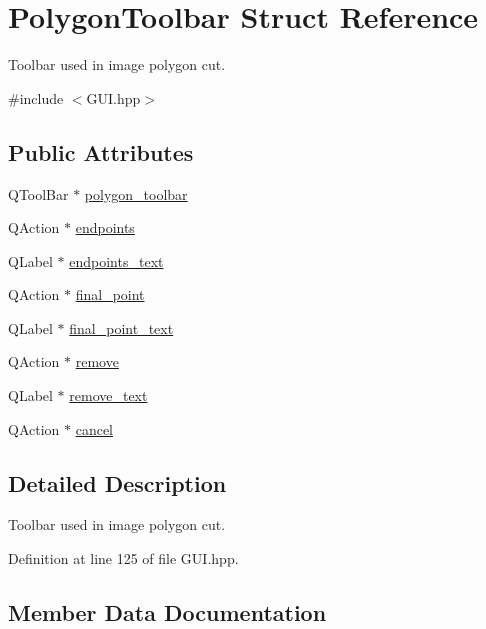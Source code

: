\hypertarget{structPolygonToolbar}{}\section{Polygon\+Toolbar Struct Reference}
\label{structPolygonToolbar}


Toolbar used in image polygon cut.  




{\ttfamily \#include $<$G\+U\+I.\+hpp$>$}

\subsection*{Public Attributes}
\begin{DoxyCompactItemize}
\item 
Q\+Tool\+Bar $\ast$ \mbox{\hyperlink{structPolygonToolbar_a5388c77217c5bea7075cf234c508b8d6}{polygon\+\_\+toolbar}}
\item 
Q\+Action $\ast$ \mbox{\hyperlink{structPolygonToolbar_a78a569efc30754e02b7d8f5d74ede0ec}{endpoints}}
\item 
Q\+Label $\ast$ \mbox{\hyperlink{structPolygonToolbar_a4ab3ad9905d894a2f166a4e1cbfb9e3a}{endpoints\+\_\+text}}
\item 
Q\+Action $\ast$ \mbox{\hyperlink{structPolygonToolbar_a25d471a6081bfa4107d5f1cd9a61d243}{final\+\_\+point}}
\item 
Q\+Label $\ast$ \mbox{\hyperlink{structPolygonToolbar_a3af92f094b85ad63be4d9dcf37a88fa8}{final\+\_\+point\+\_\+text}}
\item 
Q\+Action $\ast$ \mbox{\hyperlink{structPolygonToolbar_ad5f83fc2ac8daf17ae3014d05d3f5d5b}{remove}}
\item 
Q\+Label $\ast$ \mbox{\hyperlink{structPolygonToolbar_ad396d8e37e491bb7bfa8bf91d318014c}{remove\+\_\+text}}
\item 
Q\+Action $\ast$ \mbox{\hyperlink{structPolygonToolbar_aea894e742da9051f58af268c43212a22}{cancel}}
\end{DoxyCompactItemize}


\subsection{Detailed Description}
Toolbar used in image polygon cut. 

Definition at line 125 of file G\+U\+I.\+hpp.



\subsection{Member Data Documentation}
\mbox{\label{structPolygonToolbar_aea894e742da9051f58af268c43212a22}} 

